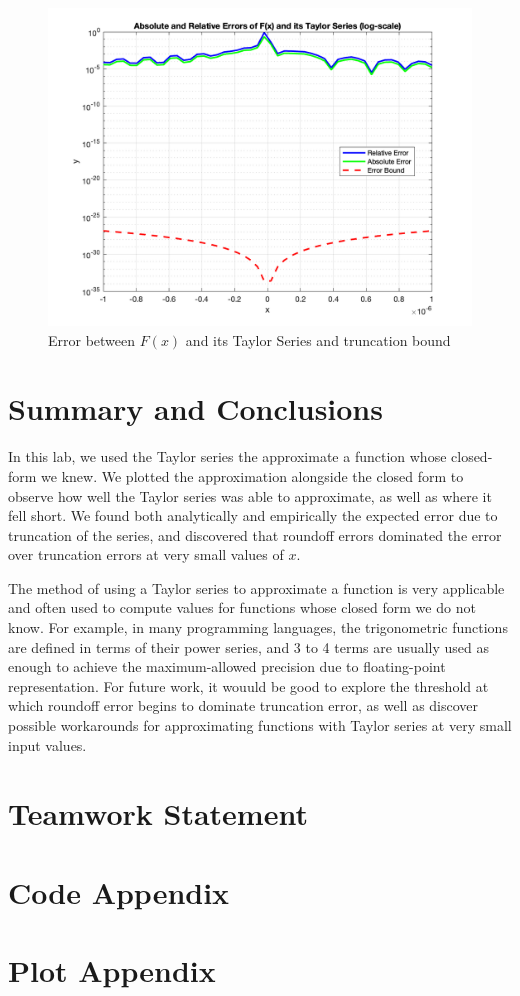 \documentclass[letter,11pt]{article}
\begin{document}
\begin{figure}[h]
  \centering
  \includegraphics[width=0.8\linewidth]{lab1b_3_error_bound.png}
  \caption{Error between $F(x)$ and its Taylor Series and truncation bound}
  \label{fig:lab1b_3_error_bound}
\end{figure}

\section{Summary and Conclusions}

In this lab, we used the Taylor series the approximate a function whose closed-form we knew. We plotted the approximation alongside the closed form to observe how well the Taylor series was able to approximate, as well as where it fell short. We found both analytically and empirically the expected error due to truncation of the series, and discovered that roundoff errors dominated the error over truncation errors at very small values of $x$.

The method of using a Taylor series to approximate a function is very applicable and often used to compute values for functions whose closed form we do not know. For example, in many programming languages, the trigonometric functions are defined in terms of their power series, and 3 to 4 terms are usually used as enough to achieve the maximum-allowed precision due to floating-point representation. For future work, it wouuld be good to explore the threshold at which roundoff error begins to dominate truncation error, as well as discover possible workarounds for approximating functions with Taylor series at very small input values.

\begin{thebibliography}{99}
\end{thebibliography}

\section*{Teamwork Statement}

\section*{Code Appendix}

\section*{Plot Appendix}
\end{document}
